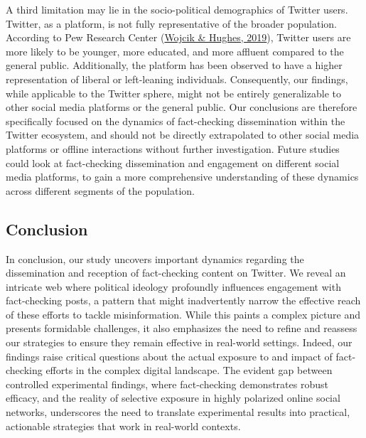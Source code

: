 \documentclass[
  12pt,
]{article}
\begin{document}
A third limitation may lie in the socio-political demographics of
Twitter users. Twitter, as a platform, is not fully representative of
the broader population. According to Pew Research Center
(\protect\hyperlink{ref-wojcik2019sizing}{Wojcik \& Hughes, 2019}),
Twitter users are more likely to be younger, more educated, and more
affluent compared to the general public. Additionally, the platform has
been observed to have a higher representation of liberal or left-leaning
individuals. Consequently, our findings, while applicable to the Twitter
sphere, might not be entirely generalizable to other social media
platforms or the general public. Our conclusions are therefore
specifically focused on the dynamics of fact-checking dissemination
within the Twitter ecosystem, and should not be directly extrapolated to
other social media platforms or offline interactions without further
investigation. Future studies could look at fact-checking dissemination
and engagement on different social media platforms, to gain a more
comprehensive understanding of these dynamics across different segments
of the population.

\hypertarget{conclusion}{%
\subsection{Conclusion}\label{conclusion}}

In conclusion, our study uncovers important dynamics regarding the
dissemination and reception of fact-checking content on Twitter. We
reveal an intricate web where political ideology profoundly influences
engagement with fact-checking posts, a pattern that might inadvertently
narrow the effective reach of these efforts to tackle misinformation.
While this paints a complex picture and presents formidable challenges,
it also emphasizes the need to refine and reassess our strategies to
ensure they remain effective in real-world settings. Indeed, our
findings raise critical questions about the actual exposure to and
impact of fact-checking efforts in the complex digital landscape. The
evident gap between controlled experimental findings, where
fact-checking demonstrates robust efficacy, and the reality of selective
exposure in highly polarized online social networks, underscores the
need to translate experimental results into practical, actionable
strategies that work in real-world contexts.
\end{document}
